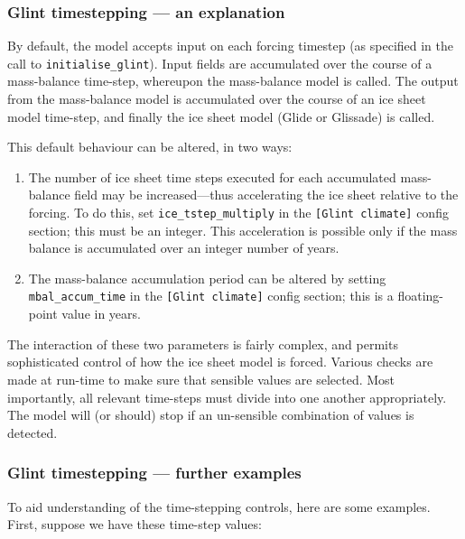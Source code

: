 \subsubsection{Glint timestepping --- an explanation}

By default, the model accepts input on each forcing timestep (as specified in 
the call to \texttt{initialise\_glint}). Input fields are accumulated over the course 
of a mass-balance time-step, whereupon the mass-balance model is called. The 
output from the mass-balance model is accumulated over the course of an ice sheet
model time-step, and finally the ice sheet model (Glide or Glissade) is called.

This default behaviour can be altered, in two ways:
\begin{enumerate}
\item The number of ice sheet time steps executed for each accumulated 
mass-balance field may be increased---thus accelerating the ice sheet relative 
to the forcing. To do this, set \texttt{ice\_tstep\_multiply} in the \texttt{[Glint climate]} 
config section; this must be an integer. This acceleration is possible only if the 
mass balance is accumulated over an integer number of years.
\item The mass-balance accumulation period can be altered by setting  
\texttt{mbal\_accum\_time} in the \texttt{[Glint climate]} config section; this is a 
floating-point value in years.
\end{enumerate}
%
The interaction of these two parameters is fairly complex, and permits
sophisticated control of how the ice sheet model is forced. 
Various checks are made at run-time to make sure that sensible values are selected. Most 
importantly, all relevant time-steps must divide into one another 
appropriately. The model will (or should) stop if an un-sensible combination 
of values is detected.

\subsubsection{Glint timestepping --- further examples}

To aid understanding of the time-stepping controls, here are some examples. First, suppose we have these time-step values:

